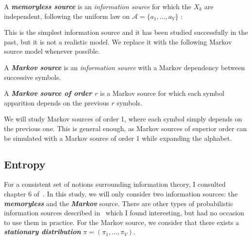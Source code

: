 \begin{df}
    \label{def:memoryless}
    A \emph{\bfseries memoryless source} is an \emph{information source}
    for which the $X_k$ are independent, following
    the uniform law on $\mathcal{A} = \{ a_1, \dots, a_V \}$ :
\end{df}

\begin{rmk}
    \label{rmk:memoryless}
    This is the simplest information source and it has been 
    studied successfully in the past, but it is not a realistic 
    model. We replace it with the following Markov source model whenever 
    possible.
\end{rmk}

\begin{df}
    \label{def:markov}
    A \emph{\bfseries Markov source} is an \emph{information source}
    with a Markov dependency between successive symbols.
\end{df}

\begin{df}
    \label{def:markovorder}
    A \emph{\bfseries Markov source of order $r$} is a Markov source
    for which each symbol apparition depends on the previous 
    $r$ symbols.
\end{df}

\begin{rmk}
    \label{rmk:markov2}
    We will study Markov sources of order 1, where each
    symbol simply depends on the previous one. This is 
    general enough, as Markov sources of superior order
    can be simulated with a Markov source of order 1 
    while expanding the alphabet.
\end{rmk}

\subsection{Entropy}

    For a consistent set of notions surrounding information theory,
    I consulted chapter 6 of~\cite{szpankowski_average_nodate}.
    In this study, we will only consider two information sources:
    the \emph{\bfseries memoryless} and the \emph{\bfseries Markov} source.
    There are other types of probabilistic information sources 
    described in~\cite{jacquet_analytic_2015} which I found interesting,
    but had no occasion to use them in practice.
    For the Markov source, we consider that there exists a 
    \emph{\bfseries stationary distribution} $\pi = (\pi_1,\dots,\pi_V)$.
    


